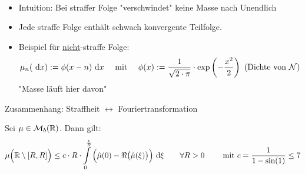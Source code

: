 \begin{bemerkung}\
	\begin{itemize}
		\item Intuition: Bei straffer Folge "verschwindet" keine Masse nach Unendlich
		\item Jede straffe Folge enthält schwach konvergente Teilfolge.
		\item Beispiel für \underline{nicht}-straffe Folge: 
		\begin{align*}
			\mu_n(\text{ d} x):=\phi(x-n)\text{ d} x
			\quad\text{ mit }\quad
			\phi(x):=\frac{1}{\sqrt{2\cdot\pi}}\cdot\exp\left(-\frac{x^2}{2}\right)\text{ (Dichte von }\mathcal{N})
		\end{align*}
		"Masse läuft hier davon"
	\end{itemize}
\end{bemerkung}

Zusammenhang: Straffheit $\longleftrightarrow$ Fouriertransformation

\begin{lemma}\label{lemma8.5}
	Sei $\mu\in\mathcal{M}_b(\mathbb{R})$.
	Dann gilt:
	\begin{align*}
		\mu\Big(\mathbb{R}\setminus[R,R]\Big)\leq
		c\cdot R\cdot\int\limits_0^{\frac{1}{R}}\Big(\hat{\mu}(0)-\Re\big(\hat{\mu}(\xi)\big)\Big)\text{ d}\xi
		\qquad\forall R>0\qquad
		\text{ mit } c=\frac{1}{1-\sin(1)}\leq 7
	\end{align*}
\end{lemma}

